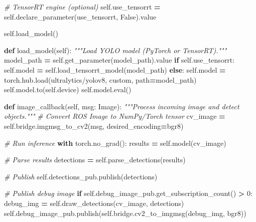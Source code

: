 \documentclass[
]{article}
\newenvironment{Shaded}{\begin{snugshade}}{\end{snugshade}}
\newcommand{\BuiltInTok}[1]{#1}
\newcommand{\CommentTok}[1]{\textcolor[rgb]{0.56,0.35,0.01}{\textit{#1}}}
\newcommand{\ControlFlowTok}[1]{\textcolor[rgb]{0.13,0.29,0.53}{\textbf{#1}}}
\newcommand{\DecValTok}[1]{\textcolor[rgb]{0.00,0.00,0.81}{#1}}
\newcommand{\KeywordTok}[1]{\textcolor[rgb]{0.13,0.29,0.53}{\textbf{#1}}}
\newcommand{\NormalTok}[1]{#1}
\newcommand{\OperatorTok}[1]{\textcolor[rgb]{0.81,0.36,0.00}{\textbf{#1}}}
\newcommand{\StringTok}[1]{\textcolor[rgb]{0.31,0.60,0.02}{#1}}
\newcommand{\VariableTok}[1]{\textcolor[rgb]{0.00,0.00,0.00}{#1}}
\begin{document}
\begin{Shaded}
\begin{Highlighting}[]
        \CommentTok{\# TensorRT engine (optional)}
        \VariableTok{self}\NormalTok{.use\_tensorrt }\OperatorTok{=} \VariableTok{self}\NormalTok{.declare\_parameter(}\StringTok{\textquotesingle{}use\_tensorrt\textquotesingle{}}\NormalTok{, }\VariableTok{False}\NormalTok{).value}

        \VariableTok{self}\NormalTok{.load\_model()}

    \KeywordTok{def}\NormalTok{ load\_model(}\VariableTok{self}\NormalTok{):}
        \CommentTok{"""Load YOLO model (PyTorch or TensorRT)."""}
\NormalTok{        model\_path }\OperatorTok{=} \VariableTok{self}\NormalTok{.get\_parameter(}\StringTok{\textquotesingle{}model\_path\textquotesingle{}}\NormalTok{).value}
        \ControlFlowTok{if} \VariableTok{self}\NormalTok{.use\_tensorrt:}
            \VariableTok{self}\NormalTok{.model }\OperatorTok{=} \VariableTok{self}\NormalTok{.load\_tensorrt\_model(model\_path)}
        \ControlFlowTok{else}\NormalTok{:}
            \VariableTok{self}\NormalTok{.model }\OperatorTok{=}\NormalTok{ torch.hub.load(}\StringTok{\textquotesingle{}ultralytics/yolov8\textquotesingle{}}\NormalTok{, }\StringTok{\textquotesingle{}custom\textquotesingle{}}\NormalTok{, path}\OperatorTok{=}\NormalTok{model\_path)}
            \VariableTok{self}\NormalTok{.model.to(}\VariableTok{self}\NormalTok{.device)}
            \VariableTok{self}\NormalTok{.model.}\BuiltInTok{eval}\NormalTok{()}

    \KeywordTok{def}\NormalTok{ image\_callback(}\VariableTok{self}\NormalTok{, msg: Image):}
        \CommentTok{"""Process incoming image and detect objects."""}
        \CommentTok{\# Convert ROS Image to NumPy/Torch tensor}
\NormalTok{        cv\_image }\OperatorTok{=} \VariableTok{self}\NormalTok{.bridge.imgmsg\_to\_cv2(msg, desired\_encoding}\OperatorTok{=}\StringTok{\textquotesingle{}bgr8\textquotesingle{}}\NormalTok{)}

        \CommentTok{\# Run inference}
        \ControlFlowTok{with}\NormalTok{ torch.no\_grad():}
\NormalTok{            results }\OperatorTok{=} \VariableTok{self}\NormalTok{.model(cv\_image)}

        \CommentTok{\# Parse results}
\NormalTok{        detections }\OperatorTok{=} \VariableTok{self}\NormalTok{.parse\_detections(results)}

        \CommentTok{\# Publish}
        \VariableTok{self}\NormalTok{.detections\_pub.publish(detections)}

        \CommentTok{\# Publish debug image}
        \ControlFlowTok{if} \VariableTok{self}\NormalTok{.debug\_image\_pub.get\_subscription\_count() }\OperatorTok{\textgreater{}} \DecValTok{0}\NormalTok{:}
\NormalTok{            debug\_img }\OperatorTok{=} \VariableTok{self}\NormalTok{.draw\_detections(cv\_image, detections)}
            \VariableTok{self}\NormalTok{.debug\_image\_pub.publish(}\VariableTok{self}\NormalTok{.bridge.cv2\_to\_imgmsg(debug\_img, }\StringTok{\textquotesingle{}bgr8\textquotesingle{}}\NormalTok{))}


\end{Highlighting}
\end{Shaded}
\end{document}
